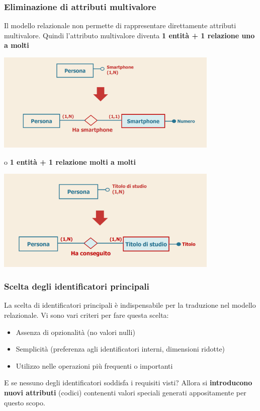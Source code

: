 \documentclass[12pt]{article}
\begin{document}
\subsubsection{Eliminazione di attributi multivalore}
Il modello relazionale non permette di rappresentare direttamente attributi multivalore.
Quindi l'attributo multivalore diventa \textbf{1 entità + 1 relazione uno a molti}
\begin{center}
    \includegraphics[width = 0.80\textwidth]{Images/110.PNG}
\end{center}
o \textbf{1 entità + 1 relazione molti a molti}
\begin{center}
    \includegraphics[width = 0.80\textwidth]{Images/111.PNG}
\end{center}
\subsubsection{Scelta degli identificatori principali}
La scelta di identificatori principali è indispensabile per la traduzione nel modello relazionale.
Vi sono vari criteri per fare questa scelta:
\begin{itemize}
    \item Assenza di opzionalità (no valori nulli)
    \item Semplicità (preferenza agli identificatori interni, dimensioni ridotte)
    \item Utilizzo nelle operazioni più frequenti o importanti
\end{itemize}
E se nessuno degli identificatori soddisfa i requisiti visti? Allora si \textbf{introducono nuovi attributi} (codici) contenenti valori speciali generati appositamente per questo scopo.
\end{document}
